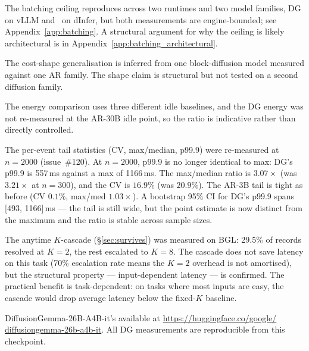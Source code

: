 The batching ceiling reproduces across two runtimes and two model
families, DG on vLLM and \LLaDA\ on dInfer, but both measurements
are engine-bounded; see
Appendix~\ref{app:batching}. A structural argument for why the ceiling
is likely architectural is in Appendix~\ref{app:batching_architectural}.

The cost-shape generalisation is inferred from one block-diffusion
model measured against one AR family. The shape claim is structural but
not tested on a second diffusion family.

The energy comparison uses three different idle baselines, and the DG
energy was not re-measured at the AR-30B idle point, so the ratio is
indicative rather than directly controlled.

The per-event tail statistics (CV, max/median, p99.9) were re-measured
at $n{=}2000$ (issue~\#120). At $n{=}2000$, p99.9 is no longer identical
to max: DG's p99.9 is 557\,ms against a max of 1166\,ms. The
max/median ratio is $3.07\times$ (was $3.21\times$ at $n{=}300$),
and the CV is $16.9\%$ (was $20.9\%$). The AR-3B tail is tight as
before (CV $0.1\%$, max/med $1.03\times$). A bootstrap 95\% CI for
DG's p99.9 spans [493, 1166]\,ms --- the tail is still wide, but the
point estimate is now distinct from the maximum and the ratio is
stable across sample sizes.

The anytime $K$-cascade (\S\ref{sec:survives}) was measured on BGL:
29.5\% of records resolved at $K{=}2$, the rest escalated to $K{=}8$.
The cascade does not save latency on this task (70\% escalation rate
means the $K{=}2$ overhead is not amortised), but the structural
property --- input-dependent latency --- is confirmed. The practical
benefit is task-dependent: on tasks where most inputs are easy, the
cascade would drop average latency below the fixed-$K$ baseline.

DiffusionGemma-26B-A4B-it's available at
\url{https://huggingface.co/google/}\\\url{diffusiongemma-26b-a4b-it}.
All DG measurements are reproducible from this checkpoint.

